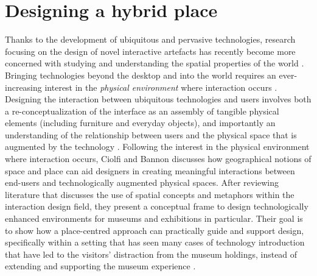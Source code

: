 \section{Designing a hybrid place}

Thanks to the development of ubiquitous and pervasive technologies, research focusing on the design of novel interactive artefacts has recently become more concerned with studying and understanding the spatial properties of the world \autocite[p. 159]{hybridplace_ciolfi}. Bringing technologies beyond the desktop and into the world requires an ever-increasing interest in the \emph{physical environment} where interaction occurs \autocite[p. 159]{hybridplace_ciolfi}.  Designing the interaction between ubiquitous technologies and users involves both a re-conceptualization of the interface as an assembly of tangible physical elements (including furniture and everyday objects), and importantly an understanding of the relationship between users and the physical space that is augmented by the technology \autocite[p. 159]{hybridplace_ciolfi}. Following the interest in the physical environment where interaction occurs, Ciolfi and Bannon discusses how geographical notions of space and place can aid designers in creating meaningful interactions between end-users and technologically augmented physical spaces. After reviewing literature that discusses the use of spatial concepts and metaphors within the interaction design field, they present a conceptual frame to design technologically enhanced environments for museums and exhibitions in particular. Their goal is to show how a place-centred approach can practically guide and support design, specifically within a setting that has seen many cases of technology introduction that have led to the visitors' distraction from the museum holdings, instead of extending and supporting the museum experience \autocite[p. 159-160]{hybridplace_ciolfi}.





